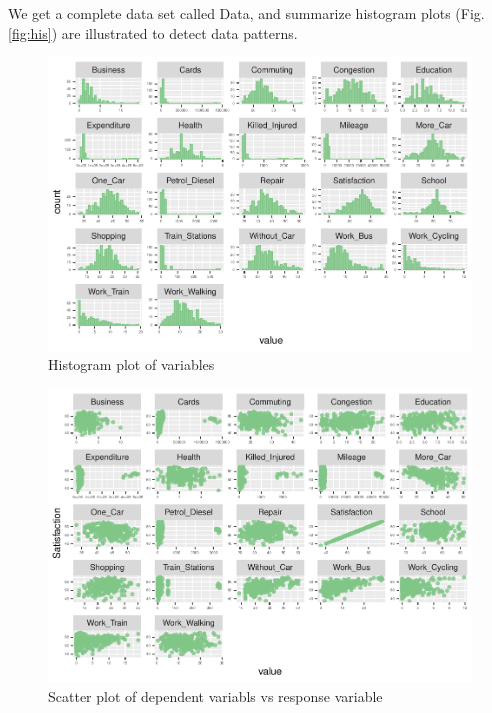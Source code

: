 \documentclass[
]{article}
\newenvironment{Shaded}{\begin{snugshade}}{\end{snugshade}}
\newcommand{\CommentTok}[1]{\textcolor[rgb]{0.56,0.35,0.01}{\textit{#1}}}
\newcommand{\FunctionTok}[1]{\textcolor[rgb]{0.00,0.00,0.00}{#1}}
\newcommand{\NormalTok}[1]{#1}
\newcommand{\OtherTok}[1]{\textcolor[rgb]{0.56,0.35,0.01}{#1}}
\newcommand{\SpecialCharTok}[1]{\textcolor[rgb]{0.00,0.00,0.00}{#1}}
\begin{document}
\begin{Shaded}
\end{Shaded}

We get a complete data set called Data, and summarize histogram plots
(Fig. \ref{fig:his}) are illustrated to detect data patterns.

\begin{figure}

{\centering \includegraphics{RMD-Group-28_files/figure-latex/unnamed-chunk-3-1} 

}

\caption{\label{fig:his} Histogram plot of variables}\label{fig:unnamed-chunk-3}
\end{figure}

\begin{figure}

{\centering \includegraphics{RMD-Group-28_files/figure-latex/unnamed-chunk-4-1} 

}

\caption{\label{fig:scatter} Scatter plot of dependent variabls vs response variable}\label{fig:unnamed-chunk-4}
\end{figure}
\end{document}
